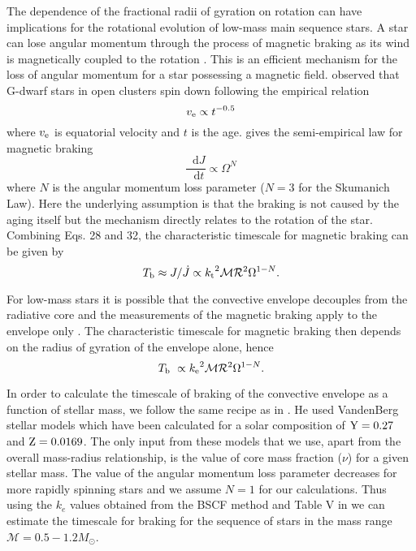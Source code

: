 \documentclass[a4paper,fleqn,usenatbib]{mnras}
\newcommand*\diff{\mathop{}\!\mathrm{d}}
\begin{document}
The dependence of the fractional radii of gyration on rotation can have implications for the rotational evolution of low-mass main sequence stars. 
A star can lose angular momentum through the process of magnetic braking as its wind is magnetically coupled to the rotation \citep{Mestel1968}.
This is an efficient mechanism for the loss of angular momentum for a star possessing a magnetic field. \cite{Skumanich1972} observed that G-dwarf stars in open clusters spin down following the empirical relation
\begin{equation}
v_{\rm e} \propto t^{-0.5}
\end{equation}
where $v_{\rm e}$ is equatorial velocity and $t$ is the age.
\cite{Vilhu1982} gives the semi-empirical law for magnetic braking  
\begin{equation}
\frac{\diff{J}}{\diff{t}} \propto \Omega^{N}
\end{equation}
where ${N}$ is the angular momentum loss parameter  (${N}=3$ for the Skumanich Law).
Here the underlying assumption is that the braking is not caused by the aging itself but the mechanism directly relates to the rotation of the star. 
Combining Eqs. 28 and 32, the characteristic timescale for magnetic braking can be given by
 \begin{equation}
    T_{\rm b} \approx J/\dot{J} \propto {k_{\rm t}}^2 \mathcal{M} \mathcal{R}^2 \Omega^{1-{N}}.
 \end{equation} 
 
For low-mass stars it is possible that the convective envelope decouples from the radiative core and the measurements of the magnetic braking apply to the envelope only \citep{Vilhu1986}. The characteristic timescale for magnetic braking then depends on the radius of gyration of the envelope alone, hence
 \begin{equation}
    T_{\rm b} \ \propto {k_{\rm e}}^2 \mathcal{M} \mathcal{R}^2 \Omega^{1-{N}}.
 \end{equation} 



In order to calculate the timescale of braking of the convective envelope as a function of stellar mass, we follow the same recipe as in \cite{Rucinski1988}.
He used VandenBerg stellar models which have been calculated for a solar composition of ${\rm Y}=0.27$ and ${\rm Z}=0.0169$. The only input from these models that we use, apart from the overall mass-radius relationship, is the value of core mass fraction ($\nu$) for a given stellar mass.
The value of the angular momentum loss parameter decreases for more rapidly spinning stars \citep{Vilhu1982} and we assume ${N}=1$ for our calculations. 
Thus using the $k_e$ values obtained from the BSCF method and Table V in \cite{Rucinski1988} we can estimate the timescale for braking for the sequence of stars in the mass range $\mathcal{M} =0.5 - 1.2 M_{\odot}$.
 
\end{document}
